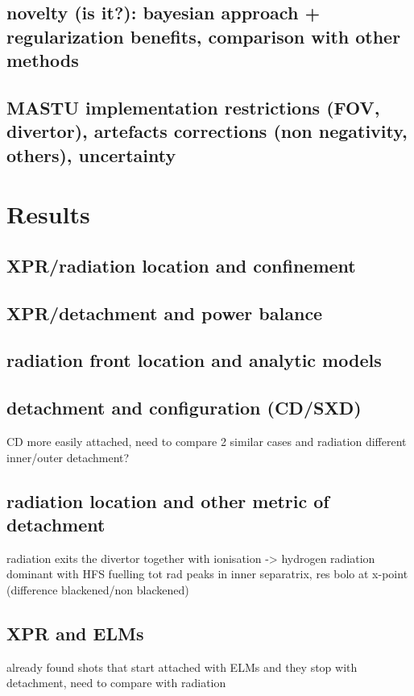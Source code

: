 \subsection{novelty (is it?): bayesian approach + regularization
benefits, comparison with other methods}
\subsection{MASTU implementation
restrictions (FOV, divertor), artefacts corrections (non negativity, others), uncertainty}

\section{Results}
\subsection{XPR/radiation location and confinement}
\subsection{XPR/detachment and power balance}
\subsection{radiation front location and analytic models}
\subsection{detachment and configuration (CD/SXD)}
CD more easily attached, need to compare 2 similar cases and radiation
different inner/outer detachment?
\subsection{radiation location and other metric of detachment}
radiation exits the divertor together with ionisation -> hydrogen radiation dominant
with HFS fuelling tot rad peaks in inner separatrix, res bolo at x-point (difference blackened/non blackened)
\subsection{XPR and ELMs}
already found shots that start attached with ELMs and they stop with detachment, need to compare with radiation